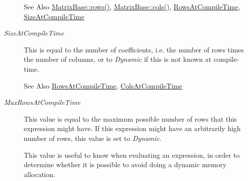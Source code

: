 \begin{Desc}
\begin{description}
\begin{DoxySeeAlso}{See Also}
\hyperlink{class_matrix_base_ae82810ba95da637cdf434b4274083723}{Matrix\-Base\-::rows()}, \hyperlink{class_matrix_base_abe5381b539f87237647bc651a1ac0364}{Matrix\-Base\-::cols()}, \hyperlink{class_matrix_base_aaa53a8ec1bc1ba52b1e50631dac15d6da10c48c1361376cbd5ef62a18966f2691}{Rows\-At\-Compile\-Time}, \hyperlink{class_matrix_base_aaa53a8ec1bc1ba52b1e50631dac15d6da74e612bdee777aa1924cbd37b5e298a4}{Size\-At\-Compile\-Time} 
\end{DoxySeeAlso}
\item[{\em 
\hypertarget{class_matrix_base_aaa53a8ec1bc1ba52b1e50631dac15d6da74e612bdee777aa1924cbd37b5e298a4}{Size\-At\-Compile\-Time}\label{class_matrix_base_aaa53a8ec1bc1ba52b1e50631dac15d6da74e612bdee777aa1924cbd37b5e298a4}
}]This is equal to the number of coefficients, i.\-e. the number of rows times the number of columns, or to {\itshape Dynamic} if this is not known at compile-\/time.\begin{DoxySeeAlso}{See Also}
\hyperlink{class_matrix_base_aaa53a8ec1bc1ba52b1e50631dac15d6da10c48c1361376cbd5ef62a18966f2691}{Rows\-At\-Compile\-Time}, \hyperlink{class_matrix_base_aaa53a8ec1bc1ba52b1e50631dac15d6da359babfd1277ae780433d99b383e00e8}{Cols\-At\-Compile\-Time} 
\end{DoxySeeAlso}
\item[{\em 
\hypertarget{class_matrix_base_aaa53a8ec1bc1ba52b1e50631dac15d6da73ed130d060f18903c34624ccb8c9894}{Max\-Rows\-At\-Compile\-Time}\label{class_matrix_base_aaa53a8ec1bc1ba52b1e50631dac15d6da73ed130d060f18903c34624ccb8c9894}
}]This value is equal to the maximum possible number of rows that this expression might have. If this expression might have an arbitrarily high number of rows, this value is set to {\itshape Dynamic}.

This value is useful to know when evaluating an expression, in order to determine whether it is possible to avoid doing a dynamic memory allocation.


\end{description}
\end{Desc}
